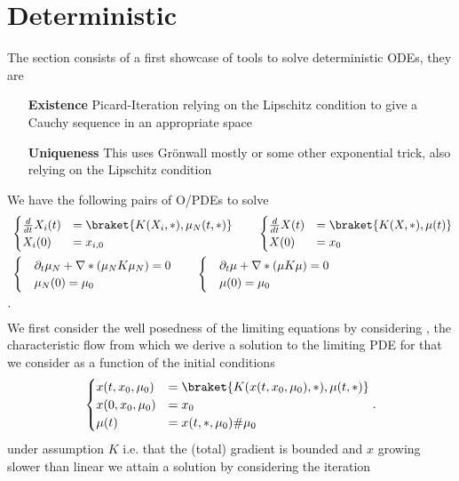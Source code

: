 \section{Deterministic}
The section consists of a first showcase of tools to solve deterministic ODEs, they are 
\begin{enumerate}
  \item[\bf Existence] Picard-Iteration relying on the Lipschitz condition to give a Cauchy sequence in an appropriate space
  \item[\bf Uniqueness] This uses Grönwall mostly or some other exponential trick, also relying on the Lipschitz condition 
\end{enumerate}
We have the following pairs of O/PDEs to solve 
\begin{align*}
  &\begin{cases}
    \frac{d}{dt} X_i(t) &= \braket{K(X_i,*),\mu_N(t,*)}\\
    X_i(0) &= x_{i,0}
  \end{cases} \qquad  
\begin{cases}
    \frac{d}{dt} X(t) &= \braket{K(X,*),\mu(t)}\\
    X(0) &= x_{0}
  \end{cases}\\
  &\begin{cases}
    &\partial_t \mu_N  + \nabla * (\mu_N K \mu_N) = 0 \\
    &\mu_N(0) = \mu_0
  \end{cases} 
  \qquad  \begin{cases}
    &\partial_t \mu  + \nabla * (\mu K \mu) = 0 \\
    &\mu(0) = \mu_0
  \end{cases} \\
.\end{align*}
We first consider the well posedness of the limiting equations by considering , the characteristic flow from which we derive a solution to the limiting PDE 
for that we consider as a function of the initial conditions 
\begin{align*}
  \begin{cases}
    x(t,x_{0},\mu_0) &= \braket{K(x(t,x_{0},\mu_0),*),\mu(t,*)}\\
    x(0,x_{0},\mu_0) &= x_{0} \\
    \mu(t) &= x(t,*,\mu_0) \# \mu_0
  \end{cases}
.\end{align*}
under assumption $K$ i.e. that the (total) gradient is bounded and $x$ growing slower than linear we attain a solution by considering the iteration 
